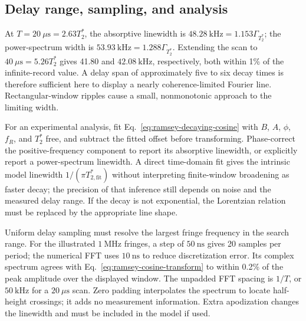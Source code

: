 \begin{table}[tb]
 \caption{Calculated Ramsey FWHM in kHz for $T_2^*=7.6~\mu\mathrm{s}$.
 Widths are the separation of the first half-height crossings of the
 isolated central line in Eq.~\eqref{eq:ramsey-finite-transform}, with a
 rectangular delay window and no additional filtering.}
 \label{tab:ramsey-fft-linewidth}
 \centering
 
\end{table}

\subsection{Delay range, sampling, and analysis}

At $T=20~\mu\mathrm{s}=2.63T_2^*$, the absorptive linewidth is
$48.28~\mathrm{kHz}=1.153\Gamma_{T_2^*}$; the power-spectrum width is
$53.93~\mathrm{kHz}=1.288\Gamma_{T_2^*}$. Extending the scan to
$40~\mu\mathrm{s}=5.26T_2^*$ gives 41.80 and $42.08~\mathrm{kHz}$,
respectively, both within 1\% of the infinite-record value. A delay span
of approximately five to six decay times is therefore sufficient here
to display a nearly coherence-limited Fourier line. Rectangular-window
ripples cause a small, nonmonotonic approach to the limiting width.

For an experimental analysis, fit Eq.~\eqref{eq:ramsey-decaying-cosine}
with $B$, $A$, $\phi$, $f_R$, and $T_2^*$ free, and subtract the fitted
offset before transforming. Phase-correct the positive-frequency component
to report its absorptive linewidth, or explicitly report a power-spectrum
linewidth. A direct time-domain fit gives the intrinsic model linewidth
$1/(\pi T_{2,\mathrm{fit}}^*)$ without interpreting finite-window broadening
as faster decay; the precision of that inference still depends on noise
and the measured delay range. If the decay is not exponential, the
Lorentzian relation must be replaced by the appropriate line shape.

Uniform delay sampling must resolve the largest fringe frequency in the
search range. For the illustrated $1~\mathrm{MHz}$ fringes, a step of
$50~\mathrm{ns}$ gives 20 samples per period; the numerical FFT uses
$10~\mathrm{ns}$ to reduce discretization error. Its complex spectrum
agrees with Eq.~\eqref{eq:ramsey-cosine-transform} to within 0.2\% of
the peak amplitude over the displayed window. The unpadded FFT spacing
is $1/T$, or $50~\mathrm{kHz}$ for a $20~\mu\mathrm{s}$ scan.
Zero padding interpolates the spectrum to locate half-height crossings;
it adds no measurement information. Extra apodization changes the
linewidth and must be included in the model if used.

